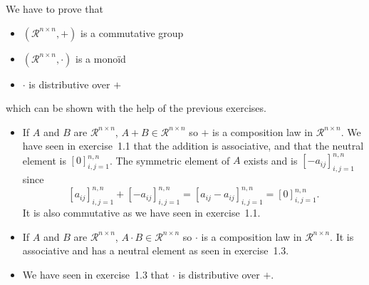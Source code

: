 \begin{solution}
  We have to prove that
  \begin{itemize}
    \item $(\mathcal{R}^{n \times n}, +)$ is a commutative group
    \item $(\mathcal{R}^{n \times n}, \cdot)$ is a monoïd
    \item $\cdot$ is distributive over $+$
  \end{itemize}
  which can be shown with the help of the previous exercises.
  \begin{itemize}
    \item If $A$ and $B$ are $\mathcal{R}^{n \times n}$, $A+B \in \mathcal{R}^{n \times n}$
      so $+$ is a composition law in $\mathcal{R}^{n \times n}$.
      We have seen in exercise~1.1 that the addition is associative, and that the neutral element is
      $[0]_{i,j=1}^{n,n}$.
      The symmetric element of $A$ exists and is $[-a_{ij}]_{i,j=1}^{n,n}$ since
      \[ [a_{ij}]_{i,j=1}^{n,n} + [-a_{ij}]_{i,j=1}^{n,n} = [a_{ij}-a_{ij}]_{i,j=1}^{n,n} = [0]_{i,j=1}^{n,n}. \]
      It is also commutative as we have seen in exercise~1.1.
    \item If $A$ and $B$ are $\mathcal{R}^{n \times n}$, $A \cdot B \in \mathcal{R}^{n \times n}$
      so $\cdot$ is a composition law in $\mathcal{R}^{n \times n}$.
      It is associative and has a neutral element as seen in exercise~1.3.
    \item We have seen in exercise~1.3 that $\cdot$ is distributive over $+$.
  \end{itemize}
\end{solution}


